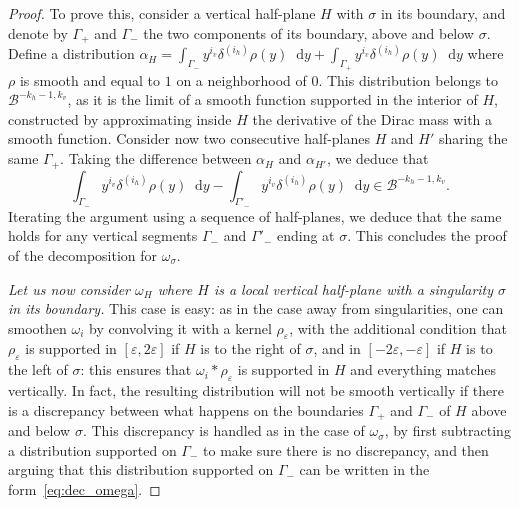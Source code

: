 \documentclass[11pt, a4paper, oneside, final, pagebackref]{amsart}
\newcommand{\boB}{\mathcal{B}}
\newcommand{\dd}{\mathop{}\!\mathrm{d}}
\renewcommand{\epsilon}{\varepsilon}
\theoremstyle{definition}
\numberwithin{equation}{section}
\begin{document}
\begin{proof}
To prove this, consider a vertical half-plane $H$ with $\sigma$ in its
boundary, and denote by $\Gamma_+$ and $\Gamma_-$ the two components of its
boundary, above and below $\sigma$. Define a distribution $\alpha_H =
\int_{\Gamma_-} y^{i_v} \delta^{(i_h)} \rho(y) \dd y + \int_{\Gamma_+}
y^{i_v} \delta^{(i_h)} \rho(y) \dd y$ where $\rho$ is smooth and equal to $1$
on a neighborhood of $0$. This distribution belongs to $\boB^{-k_h-1, k_v}$,
as it is the limit of a smooth function supported in the interior of $H$,
constructed by approximating inside $H$ the derivative of the Dirac mass with
a smooth function. Consider now two consecutive half-planes $H$ and $H'$
sharing the same $\Gamma_+$. Taking the difference between $\alpha_H$ and
$\alpha_{H'}$, we deduce that
\begin{equation*}
  \int_{\Gamma_-} y^{i_v} \delta^{(i_h)} \rho(y) \dd y
  -   \int_{\Gamma'_-} y^{i_v} \delta^{(i_h)} \rho(y) \dd y
  \in \boB^{-k_h-1, k_v}.
\end{equation*}
Iterating the argument using a sequence of half-planes, we deduce that the
same holds for any vertical segments $\Gamma_-$ and $\Gamma'_-$ ending at
$\sigma$. This concludes the proof of the decomposition for $\omega_\sigma$.

\emph{Let us now consider $\omega_H$ where $H$ is a local vertical half-plane
with a singularity $\sigma$ in its boundary.} This case is easy: as in the
case away from singularities, one can smoothen $\omega_i$ by convolving it
with a kernel $\rho_\epsilon$, with the additional condition that
$\rho_\epsilon$ is supported in $[\epsilon,2\epsilon]$ if $H$ is to the right
of $\sigma$, and in $[-2\epsilon, -\epsilon]$ if $H$ is to the left of
$\sigma$: this ensures that $\omega_i * \rho_\epsilon$ is supported in $H$
and everything matches vertically. In fact, the resulting distribution will
not be smooth vertically if there is a discrepancy between what happens on
the boundaries $\Gamma_+$ and $\Gamma_-$ of $H$ above and below $\sigma$.
This discrepancy is handled as in the case of $\omega_\sigma$, by first
subtracting a distribution supported on $\Gamma_-$ to make sure there is no
discrepancy, and then arguing that this distribution supported on $\Gamma_-$
can be written in the form~\eqref{eq:dec_omega}.


\end{proof}
\end{document}

